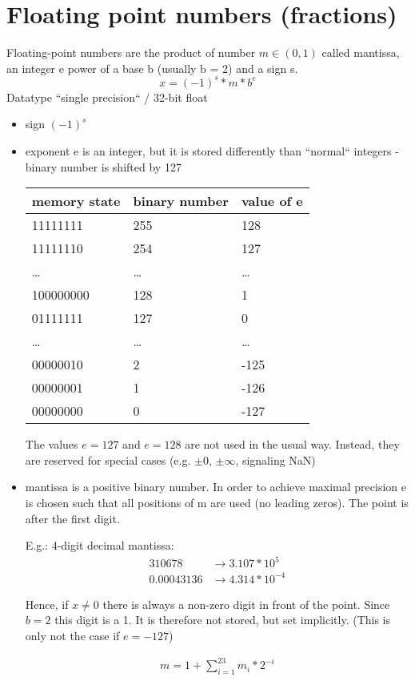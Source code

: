 \section{Floating point numbers (fractions)}\label{sec:floating-point-numbers-(fractions)}
Floating-point numbers are the product of number $m \in (0,1)$ called mantissa, an integer e power of
a base b (usually b = 2) and a sign s.
\begin{equation*}
    x = (-1)^s * m * b^e
\end{equation*}
{}
Datatype ``single precision`` / 32-bit float
\begin{itemize}
    \item sign $(-1)^s$
    \item exponent e is an integer, but it is stored differently than ``normal`` integers - binary number is shifted by 127

    \begin{tabular}{l | l | l}
        memory state & binary number & value of e \\
        \hline
        11111111     & 255           & 128        \\
        11111110     & 254           & 127        \\
        \ldots       & \ldots        & \ldots     \\
        100000000    & 128           & 1          \\
        01111111     & 127           & 0          \\
        \ldots       & \ldots        & \ldots     \\
        00000010     & 2             & -125       \\
        00000001     & 1             & -126       \\
        00000000     & 0             & -127
    \end{tabular}

    The values $e = 127$ and $e = 128$ are not used in the usual way.
    Instead, they are reserved for special cases (e.g. $\pm 0$, $ \pm \infty$, signaling NaN)
    \item mantissa is a positive binary number.
    In order to achieve maximal precision e is chosen such that all positions of m are used (no leading zeros).
    The point is after the first digit.

    E.g.: 4-digit decimal mantissa:
    \begin{align*}
        310678 &\rightarrow 3.107 * 10^5 \\
        0.00043136 &\rightarrow 4.314 * 10^{-4}
    \end{align*}

    Hence, if $x \neq 0$ there is always a non-zero digit in front of the point.
    Since $b = 2$ this digit is a 1.
    It is therefore not stored, but set implicitly.
    (This is only not the case if $e=-127$)

    \begin{align*}
        m = 1 + \sum_{i = 1}^{23} m_i * 2^{-i}
    \end{align*}
\end{itemize}

